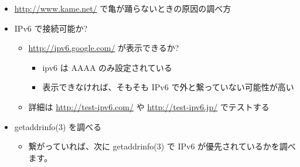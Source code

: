 \documentclass[mingoth,a4paper]{jsarticle}
\begin{document}
\begin{itemize}
\item \url{http://www.kame.net/} で亀が踊らないときの原因の調べ方
\item IPv6 で接続可能か?

\begin{itemize}
\item \url{http://ipv6.google.com/} が表示できるか?

\begin{itemize}
\item ipv6 は AAAA のみ設定されている
\item 表示できなければ、そもそも IPv6 で外と繋っていない可能性が高い
\end{itemize}

\item 詳細は \url{http://test-ipv6.com/} や \url{http://test-ipv6.jp/} でテストする
\end{itemize}

\item getaddrinfo(3) を調べる

\begin{itemize}
\item 繋がっていれば、次に getaddrinfo(3) で IPv6 が優先されているかを調べます。
\end{itemize}

\end{itemize}
\end{document}
